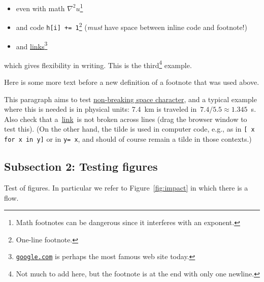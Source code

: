 \n\documentclass[%
oneside,                 %
final,                   %
10pt]{article}
\newenvironment{notice_mdfboxadmon}[1][]{
\begin{notice_mdfboxmdframed}[frametitle=#1]
}
{
\end{notice_mdfboxmdframed}
}
\theoremstyle{definition}
\begin{document}
\begin{enumerate}
\begin{itemize}
 \item even with math $\nabla^2u$\footnote{Math footnotes can be dangerous since it interferes with an exponent.}

 \item and code \texttt{h[i] += 1}\footnote{One-line footnote.} (\emph{must} have space between inline code and footnote!)

 \item and \href{{https://google.com}}{links}\footnote{\href{{google.com}}{\nolinkurl{google.com}} is perhaps the most famous web site today.}
\end{itemize}

\noindent
which gives flexibility in writing.
This is the third\footnote{Not much to add here, but the footnote is at the end with only one newline.} example.

Here is some more text before a new definition of a footnote that was
used above.


\begin{notice_mdfboxadmon}
This paragraph aims to test \href{{https://en.wikipedia.org/wiki/Non-breaking_space}}{non-breaking space character}, and a typical
example where this is needed is in physical units: 7.4~km is traveled
in~$7.4/5.5\approx 1.345$~s.  Also check that a~\href{{https://google.com}}{link}~is
not broken across lines (drag the browser window to test this).
(On the other hand, the tilde is used in
computer code, e.g., as in \texttt{[~x for x in y]} or in \texttt{y=~x}, and should
of course remain a tilde in those contexts.)
\end{notice_mdfboxadmon} %



\subsection{Subsection 2: Testing figures}
\label{subsec:ex}

Test of figures. In particular we refer to Figure~\vref{fig:impact} in which
there is a flow.


\end{enumerate}
\end{document}
